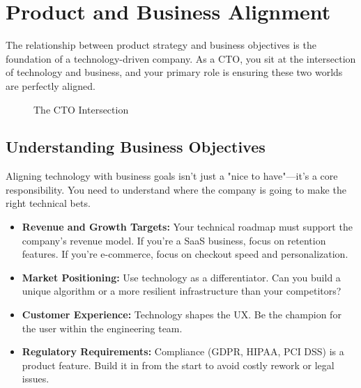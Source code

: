 \section{Product and Business Alignment}

The relationship between product strategy and business objectives is the foundation of a technology-driven company. As a \gls{CTO}, you sit at the intersection of technology and business, and your primary role is ensuring these two worlds are perfectly aligned.

\begin{figure}[h]
    \centering
    \caption{The CTO Intersection}
    \label{fig:cto_intersection}
\end{figure}

\subsection{Understanding Business Objectives}

Aligning technology with business goals isn't just a "nice to have"—it's a core responsibility. You need to understand where the company is going to make the right technical bets.

\begin{itemize}
    \item \textbf{Revenue and Growth Targets:} Your technical roadmap must support the company's revenue model. If you're a \gls{SaaS} business, focus on retention features. If you're e-commerce, focus on checkout speed and personalization.
    \item \textbf{Market Positioning:} Use technology as a differentiator. Can you build a unique algorithm or a more resilient infrastructure than your competitors?
    \item \textbf{Customer Experience:} Technology shapes the \gls{UX}. Be the champion for the user within the engineering team.
    \item \textbf{Regulatory Requirements:} Compliance (GDPR, HIPAA, PCI DSS) is a product feature. Build it in from the start to avoid costly rework or legal issues.
\end{itemize}

